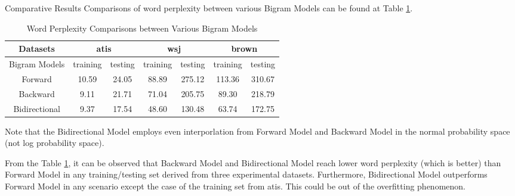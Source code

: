 \documentclass[11pt,a4paper]{article}
\begin{document}
\begin{section}{Comparative Results}
    Comparisons of word perplexity between various Bigram Models
    can be found at Table \ref{wptable}.  

    \begin{table}[h] \centering
        \caption{Word Perplexity Comparisons between Various Bigram Models}
        \label{wptable}
        \begin{tabular}{|c||c|c||c|c||c|c|}
            \hline
            Datasets  & \multicolumn{2}{|c||}{atis} & \multicolumn{2}{|c||}{wsj} & 
            \multicolumn{2}{|c|}{brown} \\ \hline
            Bigram Models  & training & testing & training & testing  &training & testing  \\ \hline
  Forward & 10.59 & 24.05 & 88.89 & 275.12 & 113.36  & 310.67 \\
  Backward & 9.11 & 21.71 & 71.04 & 205.75 & 89.30 & 218.79 \\
  Bidirectional & 9.37 &  17.54 & 48.60 & 130.48 & 63.74 & 172.75 \\
            \hline
        \end{tabular}
    \end{table}

    Note that the Bidirectional Model employs even interporlation from Forward
    Model and Backward Model in the normal probability space (not log
    probability space).

    From the Table \ref{wptable}, it can be observed that Backward Model and
    Bidirectional Model reach lower word perplexity (which is better) than
    Forward Model in any training/testing set derived from three
    experimental datasets. 
    Furthermore, Bidirectional Model outperforms Forward Model in any
    scenario except the case of the training set from atis. This could be
    out of the overfitting phenomenon.

\end{section}
\end{document}
